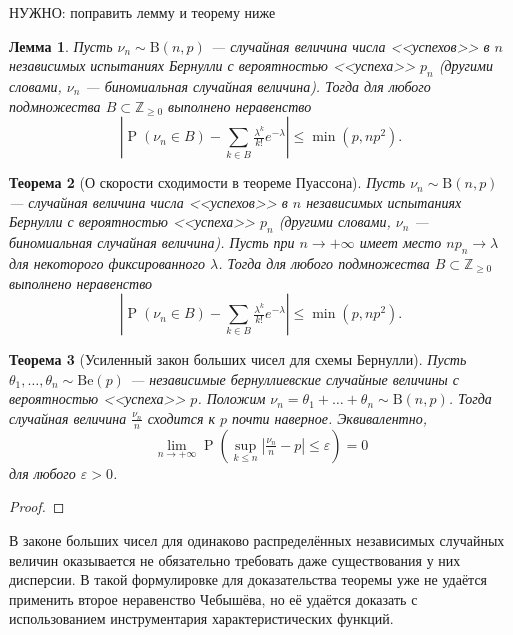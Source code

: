 \documentclass[12pt]{article}
\newtheorem{theorem}{Теорема}
\newtheorem{lemma}[theorem]{Лемма}
\numberwithin{theorem}{section}
\theoremstyle{definition}
\newcommand{\prob}{\operatorname{P}}
\newcommand{\TODO}[1]{\textcolor{todocolor}{НУЖНО: #1}}
\begin{document}
	\TODO{поправить лемму и теорему ниже}
	
	\begin{lemma}
		Пусть $ \nu_n \sim \mathrm{B}(n, p) $ --- случайная величина числа <<успехов>> в $ n $ независимых испытаниях Бернулли
		с вероятностью <<успеха>> $ p_n $ (другими словами, $ \nu_n $ --- биномиальная случайная величина).
		Тогда для любого подмножества $ B \subset \mathbb{Z}_{\geqslant 0} $ выполнено неравенство
		$$ \left|\prob(\nu_n \in B) - \sum\limits_{k \in B}\tfrac{\lambda^k}{k!}e^{-\lambda}\right| \leqslant \min(p, np^2). $$
	\end{lemma}
	
	\begin{theorem}[О скорости сходимости в теореме Пуассона]
		Пусть $ \nu_n \sim \mathrm{B}(n, p) $ --- случайная величина числа <<успехов>> в $ n $ независимых испытаниях Бернулли
		с вероятностью <<успеха>> $ p_n $ (другими словами, $ \nu_n $ --- биномиальная случайная величина).
		Пусть при $ n \to +\infty $ имеет место $ np_n \to \lambda $ для некоторого фиксированного $ \lambda $.
		Тогда для любого подмножества $ B \subset \mathbb{Z}_{\geqslant 0} $ выполнено неравенство
		$$ \left|\prob(\nu_n \in B) - \sum\limits_{k \in B}\tfrac{\lambda^k}{k!}e^{-\lambda}\right| \leqslant \min(p, np^2). $$
	\end{theorem}
	
	\begin{theorem}[Усиленный закон больших чисел для схемы Бернулли]
		Пусть $ \theta_1, \ldots, \theta_n \sim \mathrm{Be}(p) $ --- независимые бернуллиевские случайные величины
		с вероятностью <<успеха>> $ p $. Положим $ \nu_n = \theta_1 + \ldots + \theta_n \sim \mathrm{B}(n, p) $.
		Тогда случайная величина $ \tfrac{\nu_n}{n} $ сходится к $ p $ почти наверное.
		Эквивалентно,
		$$ \lim\limits_{n \to +\infty} 
		\prob(\sup\limits_{k \leqslant n} \left|\tfrac{\nu_n}{n} - p\right| \leqslant \varepsilon) = 0 $$
		для любого $ \varepsilon > 0 $.
	\end{theorem}
	
	\begin{proof}
		
	\end{proof}
	
	В законе больших чисел для одинаково распределённых независимых случайных величин 
	оказывается не обязательно требовать даже существования у них дисперсии.
	В такой формулировке для доказательства теоремы уже не удаётся применить второе неравенство Чебышёва,
	но её удаётся доказать с использованием инструментария характеристических функций.
	
\end{document}
